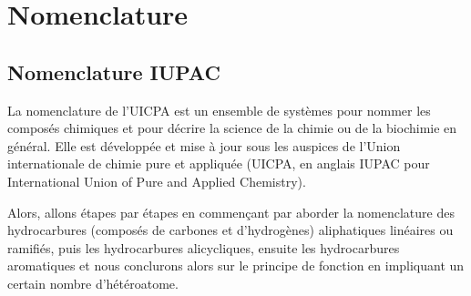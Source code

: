 \documentclass[a4paper, oneside]{book}
\begin{document}
\chapter{Nomenclature}
\minitoc
\section{Nomenclature IUPAC}
La nomenclature de l'UICPA est un ensemble de systèmes pour nommer les composés chimiques et pour décrire la science de la chimie ou de la biochimie en général. Elle est développée et mise à jour sous les auspices de l'Union internationale de chimie pure et appliquée (UICPA, en anglais IUPAC pour International Union of Pure and Applied Chemistry).

Alors, allons étapes par étapes en commençant par aborder la nomenclature des hydrocarbures (composés de carbones et d'hydrogènes) aliphatiques linéaires ou ramifiés, puis les hydrocarbures alicycliques, ensuite les hydrocarbures aromatiques et nous conclurons alors sur le principe de fonction en impliquant un certain nombre d'hétéroatome.
\end{document}
